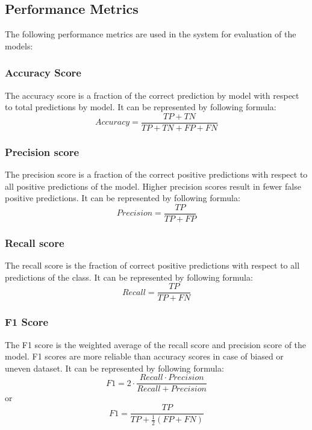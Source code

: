 {\responsemod

\subsection{Performance Metrics} \label{subsec:performance_metrics}
The following performance metrics are used in the system for evaluation of the models:

\subsubsection{Accuracy Score}\label{subsubsec:accuracy_score}
The accuracy score is a fraction of the correct prediction by model with respect to total
predictions by model. It can be represented by following formula:
\begin{equation*}\label{eq:accuracy_score}
    Accuracy = \frac{TP+TN}{TP+TN+FP+FN}
\end{equation*}

\subsubsection{Precision score}\label{subsubsec:precision_score}
The precision score is a fraction of the correct positive predictions with respect to all
positive predictions of the model. Higher precision scores result in fewer false positive
predictions. It can be represented by following formula:
\begin{equation*}\label{eq:precision_score}
    Precision = \frac{TP}{TP+FP}
\end{equation*}

\subsubsection{Recall score}\label{subsubsec:recall_score}
The recall score is the fraction of correct positive predictions with respect to all
predictions of the class. It can be represented by following formula:
\begin{equation*}\label{eq:recall_score}
    Recall = \frac{TP}{TP+FN}
\end{equation*}

\subsubsection{F1 Score}\label{subsubsec:f1_score}
The F1 score is the weighted average of the recall score and precision score of the model. F1 scores are more reliable than accuracy scores in case of biased or uneven dataset. It can be represented by following formula:
\begin{equation*}\label{eq:f1_score}
    F1 = 2 \cdot \frac{Recall \cdot Precision}{Recall + Precision}
\end{equation*}
or
\begin{equation*}\label{eq:f1_score_2}
    F1 = \frac{TP}{TP+\frac{1}{2}(FP+FN)}
\end{equation*}

}
